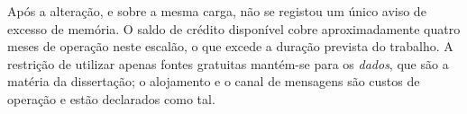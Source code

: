 Após a alteração, e sobre a mesma carga, não se registou um único aviso de excesso de memória. O
saldo de crédito disponível cobre aproximadamente quatro meses de operação neste escalão, o que
excede a duração prevista do trabalho. A restrição de utilizar apenas fontes gratuitas mantém-se
para os \emph{dados}, que são a matéria da dissertação; o alojamento e o canal de mensagens são
custos de operação e estão declarados como tal.
